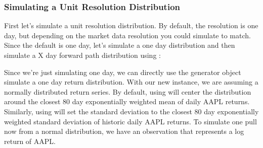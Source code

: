 \documentclass[letterpaper,10pt,english]{sphinxmanual}
\begin{document}
\subsubsection{Simulating a Unit Resolution Distribution}
\label{\detokenize{gettingstarted:simulating-a-unit-resolution-distribution}}
First let’s simulate a unit resolution distribution. By default, the
resolution is one day, but depending on the market data resolution you
could simulate to match. Since the default is one day, let’s simulate a
one day distribution and then simulate a X day forward path distribution
using :

%
\begin{sphinxVerbatim}[commandchars=\\\{\}]
    
  
\end{sphinxVerbatim}

Since we’re just simulating one day, we can directly use the generator
object simulate a one day return distribution. With our new
 instance, we are assuming a normally
distributed return series. By default, using  will
center the distribution around the closest 80 day exponentially weighted
mean of daily AAPL returns. Similarly, using  will set
the standard deviation to the closest 80 day exponentially weighted
standard deviation of historic daily AAPL returns. To simulate one pull
now from a normal distribution, we have an observation that represents a
log return of AAPL.

%
\begin{sphinxVerbatim}[commandchars=\\\{\}]
\end{sphinxVerbatim}
\end{document}

